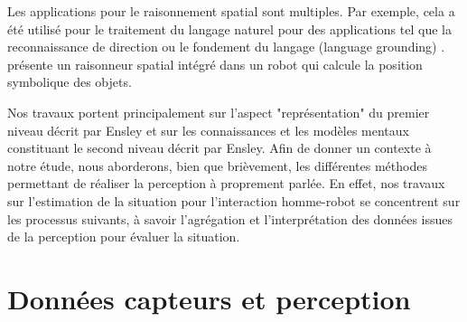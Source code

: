 \documentclass[a4paper,11pt,twoside]{StyleThese}
\begin{document}
Les applications pour le raisonnement spatial \cite{OKeefe1999} sont multiples. Par exemple, cela a été utilisé pour le traitement du langage naturel pour des applications tel que la reconnaissance de direction \cite{Kollar10,Matuszek10}
ou le fondement du langage (language grounding) \cite{Tellex10}. \cite{Skubic2004} présente un raisonneur spatial intégré dans un robot qui calcule la position symbolique des objets.


Nos travaux portent principalement sur l'aspect "représentation" du premier niveau décrit par Ensley et sur les connaissances et les modèles mentaux constituant le second niveau décrit par Ensley. 
Afin de donner un contexte à notre étude, nous aborderons, bien que brièvement, les différentes méthodes permettant de réaliser la perception à proprement parlée. En effet, nos travaux sur l'estimation de la situation pour l'interaction homme-robot se concentrent sur les processus suivants, à savoir l'agrégation et l'interprétation des données issues de la perception pour évaluer la situation.








\section{Données capteurs et perception}
\label{sec:collecte}
\end{document}
